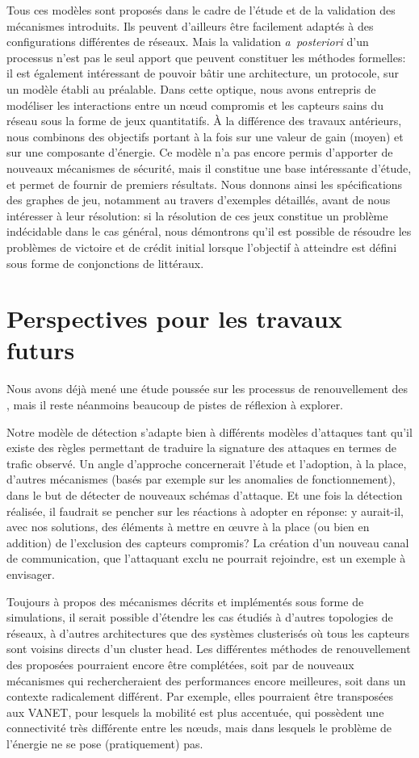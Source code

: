 Tous ces modèles sont proposés dans le cadre de l'étude et de la validation des mécanismes introduits.
Ils peuvent d'ailleurs être facilement adaptés à des configurations différentes de réseaux.
Mais la validation \textit{a~posteriori} d'un processus n'est pas le seul apport que peuvent constituer les méthodes formelles: il est également intéressant de pouvoir bâtir une architecture, un protocole, sur un modèle établi au préalable.
Dans cette optique, nous avons entrepris de modéliser les interactions entre un nœud compromis et les capteurs sains du réseau sous la forme de jeux quantitatifs.
À la différence des travaux antérieurs, nous combinons des objectifs portant à la fois sur une valeur de gain (moyen) et sur une composante d'énergie.
Ce modèle n'a pas encore permis d'apporter de nouveaux mécanismes de sécurité, mais il constitue une base intéressante d'étude, et permet de fournir de premiers résultats.
Nous donnons ainsi les spécifications des graphes de jeu, notamment au travers d'exemples détaillés, avant de nous intéresser à leur résolution: si la résolution de ces jeux constitue un problème indécidable dans le cas général, nous démontrons qu'il est possible de résoudre les problèmes de victoire et de crédit initial lorsque l'objectif à atteindre est défini sous forme de conjonctions de littéraux.

\section{Perspectives pour les travaux futurs}

Nous avons déjà mené une étude poussée sur les processus de renouvellement des \cnst, mais il reste néanmoins beaucoup de pistes de réflexion à explorer.

Notre modèle de détection s'adapte bien à différents modèles d'attaques tant qu'il existe des règles permettant de traduire la signature des attaques en termes de trafic observé.
Un angle d'approche concernerait l'étude et l'adoption, à la place, d'autres mécanismes (basés par exemple sur les anomalies de fonctionnement), dans le but de détecter de nouveaux schémas d'attaque.
Et une fois la détection réalisée, il faudrait se pencher sur les réactions à adopter en réponse: y aurait-il, avec nos solutions, des éléments à mettre en œuvre à la place (ou bien en addition) de l'exclusion des capteurs compromis?
La création d'un nouveau canal de communication, que l'attaquant exclu ne pourrait rejoindre, est un exemple à envisager.

Toujours à propos des mécanismes décrits et implémentés sous forme de simulations, il serait possible d'étendre les cas étudiés à d'autres topologies de réseaux, à d'autres architectures que des systèmes clusterisés où tous les capteurs sont voisins directs d'un cluster head.
Les différentes méthodes de renouvellement des \cnst proposées pourraient encore être complétées, soit par de nouveaux mécanismes qui rechercheraient des performances encore meilleures, soit dans un contexte radicalement différent.
Par exemple, elles pourraient être transposées aux VANET, pour lesquels la mobilité est plus accentuée, qui possèdent une connectivité très différente entre les nœuds, mais dans lesquels le problème de l'énergie ne se pose (pratiquement) pas.

